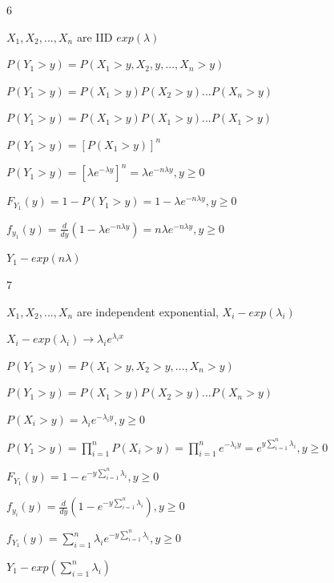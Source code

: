 \documentclass[12 pt]{article}
\begin{document}
    \begin{exercise}{6}
    \hfill

    $X_1, X_2, ..., X_n$ are IID $exp(\lambda)$

    \hfill

    $P(Y_1 > y) = P(X_1 > y, X_2, y, ..., X_n > y)$

    $P(Y_1 > y) = P(X_1 > y) P(X_2 > y) ... P(X_n > y)$

    $P(Y_1 > y) = P(X_1 > y) P(X_1 > y) ... P(X_1 > y)$

    $P(Y_1 > y) = [P(X_1 > y)]^n$

    $P(Y_1 > y) = [\lambda e^{-\lambda y}]^n = \lambda e^{-n \lambda y}, y \geq 0$

    \hfill

    $F_{Y_1}(y) = 1 - P(Y_1 > y) = 1 - \lambda e^{-n \lambda y}, y \geq 0$

    $f_{y_1}(y) = \frac{d}{dy}(1 - \lambda e^{-n \lambda y} ) = n \lambda e^{-n \lambda y}, y \geq 0$

    $Y_1 - exp(n \lambda)$

    \hfill
    \end{exercise}


    \begin{exercise}{7}
    \hfill

    $X_1, X_2, ..., X_n$ are independent exponential, $X_i - exp(\lambda_i)$

    $X_i - exp(\lambda_i) \xrightarrow{} \lambda_i e^{\lambda_i x}$

    \hfill

    $P(Y_1 > y) = P(X_1 > y, X_2 > y, ..., X_n > y)$

    $P(Y_1 > y) = P(X_1 > y) P(X_2 > y) ... P(X_n > y)$

    \hfill

    $P(X_i > y) = \lambda_i e^{-\lambda_i y}, y \geq 0$

    $P(Y_1 > y) = \prod_{i=1}^{n} P(X_i > y) = \prod_{i=1}^{n} e^{-\lambda_i y} = e^{y \sum_{i=1}^{n} \lambda_i}, y \geq 0$

    \hfill

    $F_{Y_1}(y) = 1 - e^{-y \sum_{i=1}^{n}\lambda_i}, y \geq 0$

    $f_{y_i}(y) = \frac{d}{dy}(1-e^{-y \sum_{i=1}^{n}\lambda_i}), y \geq 0$

    $f_{Y_1}(y) = \sum_{i=1}^{n} \lambda_i e^{-y \sum_{i=1}^{n} \lambda_i}, y \geq 0$

    $Y_1 - exp(\sum_{i=1}^{n} \lambda_i)$

    \hfill
    \end{exercise}
\end{document}
